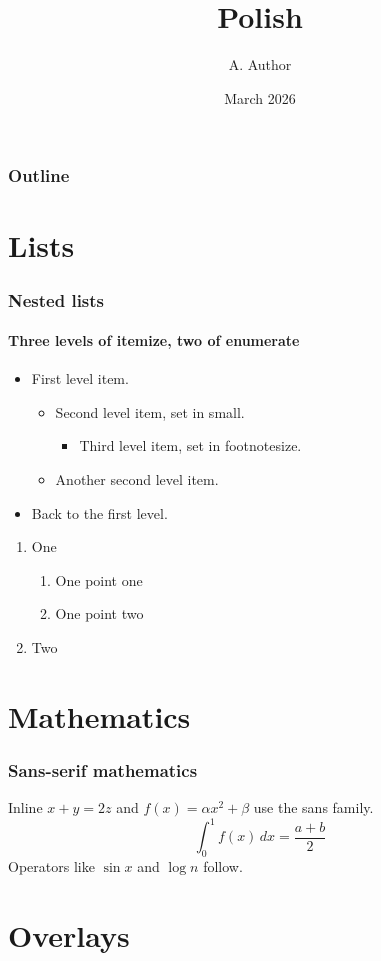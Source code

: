 \documentclass{beamer}
\title{Polish}
\author{A. Author}
\date{March 2026}
\begin{document}
\begin{frame}
  \frametitle{Outline}
  \tableofcontents
\end{frame}

\section{Lists}

\begin{frame}
  \frametitle{Nested lists}
  \framesubtitle{Three levels of itemize, two of enumerate}
  \begin{itemize}
    \item First level item.
    \begin{itemize}
      \item Second level item, set in small.
      \begin{itemize}
        \item Third level item, set in footnotesize.
      \end{itemize}
      \item Another second level item.
    \end{itemize}
    \item Back to the first level.
  \end{itemize}
  \begin{enumerate}
    \item One
    \begin{enumerate}
      \item One point one
      \item One point two
    \end{enumerate}
    \item Two
  \end{enumerate}
\end{frame}

\section{Mathematics}

\begin{frame}
  \frametitle{Sans-serif mathematics}
  Inline $x + y = 2z$ and $f(x) = \alpha x^2 + \beta$ use the sans family.
  \[
    \int_0^1 f(x)\,dx = \frac{a+b}{2}
  \]
  Operators like $\sin x$ and $\log n$ follow.
\end{frame}

\section{Overlays}
\end{document}
